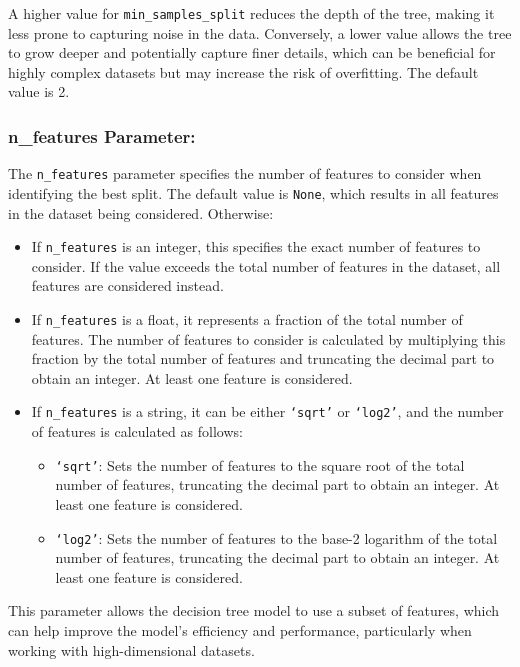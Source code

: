 \documentclass{article}
\begin{document}
A higher value for \texttt{min\_samples\_split} reduces the depth of the tree, making it less prone to capturing noise in the data. Conversely, a lower value allows the tree to grow deeper and potentially capture finer details, which can be beneficial for highly complex datasets but may increase the risk of overfitting. The default value is 2.

\subsubsection*{n\_features Parameter:}

The \texttt{n\_features} parameter specifies the number of features to consider when identifying the best split. The default value is \texttt{None}, which results in all features in the dataset being considered. Otherwise:

\begin{itemize}
    \item If \texttt{n\_features} is an integer, this specifies the exact number of features to consider. If the value exceeds the total number of features in the dataset, all features are considered instead.
    \item If \texttt{n\_features} is a float, it represents a fraction of the total number of features. The number of features to consider is calculated by multiplying this fraction by the total number of features and truncating the decimal part to obtain an integer. At least one feature is considered.
    \item If \texttt{n\_features} is a string, it can be either \texttt{`sqrt'} or \texttt{`log2'}, and the number of features is calculated as follows:
    \begin{itemize}
        \item \texttt{`sqrt'}: Sets the number of features to the square root of the total number of features, truncating the decimal part to obtain an integer. At least one feature is considered.
        \item \texttt{`log2'}: Sets the number of features to the base-2 logarithm of the total number of features, truncating the decimal part to obtain an integer. At least one feature is considered.
    \end{itemize}
\end{itemize}

This parameter allows the decision tree model to use a subset of features, which can help improve the model’s efficiency and performance, particularly when working with high-dimensional datasets.
\end{document}
